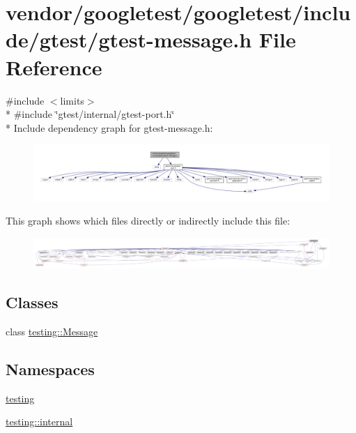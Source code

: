 \hypertarget{gtest-message_8h}{}\section{vendor/googletest/googletest/include/gtest/gtest-\/message.h File Reference}
\label{gtest-message_8h}
{\ttfamily \#include $<$limits$>$}\\*
{\ttfamily \#include \char`\"{}gtest/internal/gtest-\/port.\+h\char`\"{}}\\*
Include dependency graph for gtest-\/message.h\+:
\nopagebreak
\begin{figure}[H]
\begin{center}
\leavevmode
\includegraphics[width=350pt]{gtest-message_8h__incl}
\end{center}
\end{figure}
This graph shows which files directly or indirectly include this file\+:
\nopagebreak
\begin{figure}[H]
\begin{center}
\leavevmode
\includegraphics[width=350pt]{gtest-message_8h__dep__incl}
\end{center}
\end{figure}
\subsection*{Classes}
\begin{DoxyCompactItemize}
\item 
class \hyperlink{classtesting_1_1Message}{testing\+::\+Message}
\end{DoxyCompactItemize}
\subsection*{Namespaces}
\begin{DoxyCompactItemize}
\item 
 \hyperlink{namespacetesting}{testing}
\item 
 \hyperlink{namespacetesting_1_1internal}{testing\+::internal}
\end{DoxyCompactItemize}
